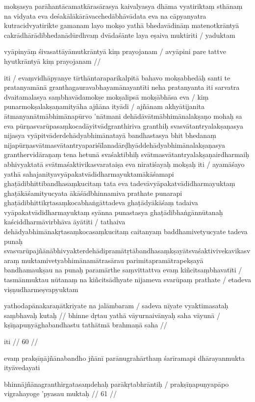 mokṣasya parāhantācamatkārasārasya kaivalyasya dhāma vyatiriktaṃ sthānaṃ na vidyata eva deśakālākārāvacchedābhāvādata eva na cāpyanyatra kutracidvyatirikte gamanam layo mokṣo yathā bhedavādināṃ matenotkrāntyā cakrādhārādibhedanādūrdhvaṃ dvādaśānte laya eṣaiva muktiriti  / yaduktam

vyāpinyāṃ śivasattāyāmutkrāntyā kiṃ prayojanam  /
avyāpini pare tattve hyutkrāntyā kiṃ prayojanam  //

iti  / evaṃvidhāpyanye tīrthāntaraparikalpitā bahavo mokṣabhedāḥ santi te pratanyamānā granthagauravabhayamānayantīti neha pratanyanta iti sarvatra dvaitamalasya saṃbhavādamokṣe mokṣalipsā mokṣābhāsa eva  / kiṃ punarmokṣalakṣaṇamityāha ajñāna ityādi  / ajñānam akhyātijanita ātmanyanātmābhimānapūrvo 'nātmani dehādāvātmābhimānalakṣaṇo mohaḥ sa eva pūrṇasvarūpasaṃkocadāyitvādgranthiriva granthiḥ svasvātantryalakṣaṇasya nijasya vyāpitvāderdehādyabhimānatayā bandhastasya bhit bhedanaṃ nijapūrṇasvātmasvātantryapariśīlanadārḍhyāddehādyabhimānalakṣaṇasya granthervidāraṇaṃ tena hetunā svaśaktibhiḥ svātmasvātantryalakṣaṇairdharmaiḥ abhivyaktatā svātmaśaktivikasvarataiṣa eva niratiśayaḥ mokṣaḥ iti  / ayamāśayo yathā sahajanityavyāpakatvādidharmayuktamākāśamapi ghaṭādibhittibandhasaṃkucitaṃ tata eva tadevāvyāpakatvādidharmayuktaṃ ghaṭākāśamityucyata ākāśādbhinnamiva prathate punarapi ghaṭādibhittikṛtasaṃkocabhaṅgāttadeva ghaṭādyākāśaṃ tadaiva vyāpakatvādidharmayuktaṃ syānna punastasya ghaṭādibhaṅgānnūtanaḥ kaściddharmāvirbhāva āyātīti  / tathaiva dehādyabhimānakṛtasaṃkocasaṃkucitaṃ caitanyaṃ baddhamivetyucyate tadeva punaḥ svasvarūpajñānābhivyakterdehādipramātṛtābandhasaṃkṣayātsvaśaktivivekavikasvaraṃ muktamivetyabhimānamātrasārau parimitapramātrapekṣayā bandhamaukṣau na punaḥ paramārthe saṃvittattva evaṃ kiñcitsaṃbhavatīti  / tasmānmuktau nūtanaṃ na kiñcitsādhyate nijameva svarūpaṃ prathate  / etadeva viṣṇudharmeṣvapyuktam

yathodapānakaraṇātkriyate na jalāmbaram  /
sadeva nīyate vyaktimasataḥ saṃbhavaḥ kutaḥ  //
bhinne dṛtau yathā vāyurnaivānyaḥ saha vāyunā  /
kṣīṇapuṇyāghabandhastu tathātmā brahmaṇā saha  //

iti  // 60  //

evaṃ prakṣīṇājñānabandho jñānī parānugrahārthaṃ śarīramapi dhārayanmukta ityāvedayati

bhinnājñānagranthirgatasaṃdehaḥ parākṛtabhrāntiḥ  /
prakṣīṇapuṇyapāpo vigrahayoge 'pyasau muktaḥ  // 61  //

